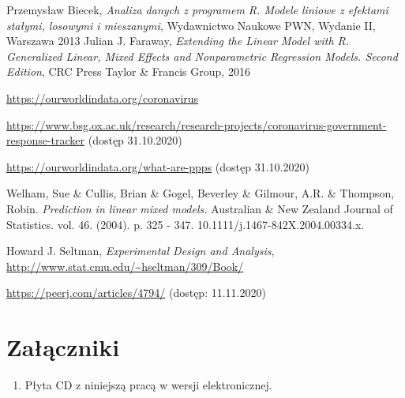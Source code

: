 \documentclass[12pt]{mwbk}
\theoremstyle{plain}
\theoremstyle{definition}
\theoremstyle{remark}
\begin{document}
\begin{thebibliography}{99}

 Przemysław Biecek, \emph{Analiza danych z programem R. Modele liniowe z efektami stałymi, losowymi i mieszanymi}, Wydawnictwo Naukowe PWN, Wydanie II, Warszawa 2013
 Julian J. Faraway, \emph{Extending the Linear Model with R. Generalized Linear, Mixed Effects and Nonparametric Regression Models. Second Edition}, CRC Press Taylor \& Francis  Group, 2016

 \url{https://ourworldindata.org/coronavirus}

 \url{https://www.bsg.ox.ac.uk/research/research-projects/coronavirus-government-response-tracker} (dostęp 31.10.2020)

 \url{https://ourworldindata.org/what-are-ppps} (dostęp 31.10.2020)

 Welham, Sue \& Cullis, Brian \& Gogel, Beverley \& Gilmour, A.R. \& Thompson, Robin. \emph{Prediction in linear mixed models.} Australian \& New Zealand Journal of Statistics. vol. 46.  (2004). p.  325 - 347. 10.1111/j.1467-842X.2004.00334.x. 

 Howard J. Seltman, \emph{Experimental Design and Analysis}, \url{http://www.stat.cmu.edu/~hseltman/309/Book/}

 \url{https://peerj.com/articles/4794/} (dostęp: 11.11.2020)

\end{thebibliography}



\listoffigures

\listoftables


\chapter*{Załączniki}
\begin{enumerate}
\item Płyta CD z niniejszą pracą w wersji elektronicznej.
\end{enumerate}
\end{document}
